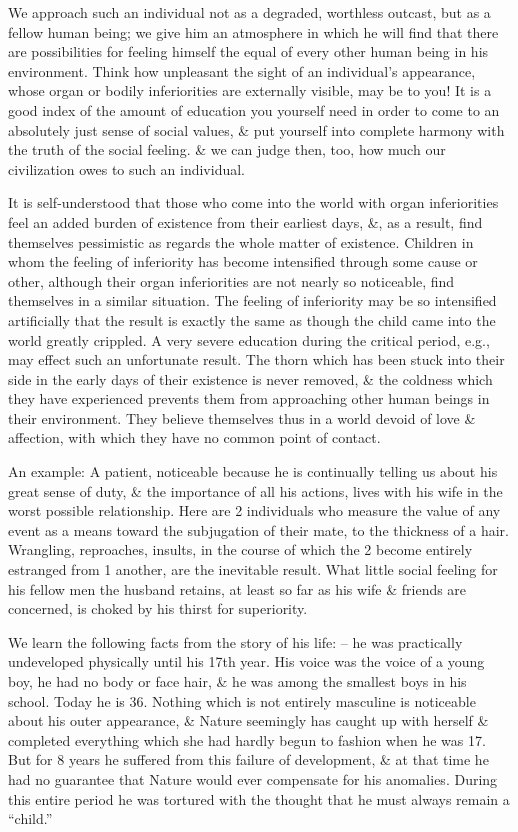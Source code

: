 \documentclass{article}
\begin{document}
We approach such an individual not as a degraded, worthless outcast, but as a fellow human being; we give him an atmosphere in which he will find that there are possibilities for feeling himself the equal of every other human being in his environment. Think how unpleasant the sight of an individual's appearance, whose organ or bodily inferiorities are externally visible, may be to you! It is a good index of the amount of education you yourself need in order to come to an absolutely just sense of social values, \& put yourself into complete harmony with the truth of the social feeling. \& we can judge then, too, how much our civilization owes to such an individual.

It is self-understood that those who come into the world with organ inferiorities feel an added burden of existence from their earliest days, \&, as a result, find themselves pessimistic as regards the whole matter of existence. Children in whom the feeling of inferiority has become intensified through some cause or other, although their organ inferiorities are not nearly so noticeable, find themselves in a similar situation. The feeling of inferiority may be so intensified artificially that the result is exactly the same as though the child came into the world greatly crippled. A very severe education during the critical period, e.g., may effect such an unfortunate result. The thorn which has been stuck into their side in the early days of their existence is never removed, \& the coldness which they have experienced prevents them from approaching other human beings in their environment. They believe themselves thus in a world devoid of love \& affection, with which they have no common point of contact.

An example: A patient, noticeable because he is continually telling us about his great sense of duty, \& the importance of all his actions, lives with his wife in the worst possible relationship. Here are 2 individuals who measure the value of any event as a means toward the subjugation of their mate, to the thickness of a hair. Wrangling, reproaches, insults, in the course of which the 2 become entirely estranged from 1 another, are the inevitable result. What little social feeling for his fellow men the husband retains, at least so far as his wife \& friends are concerned, is choked by his thirst for superiority.

We learn the following facts from the story of his life: -- he was practically undeveloped physically until his 17th year. His voice was the voice of a young boy, he had no body or face hair, \& he was among the smallest boys in his school. Today he is 36. Nothing which is not entirely masculine is noticeable about his outer appearance, \& Nature seemingly has caught up with herself \& completed everything which she had hardly begun to fashion when he was 17. But for 8 years he suffered from this failure of development, \& at that time he had no guarantee that Nature would ever compensate for his anomalies. During this entire period he was tortured with the thought that he must always remain a ``child.''
\end{document}
